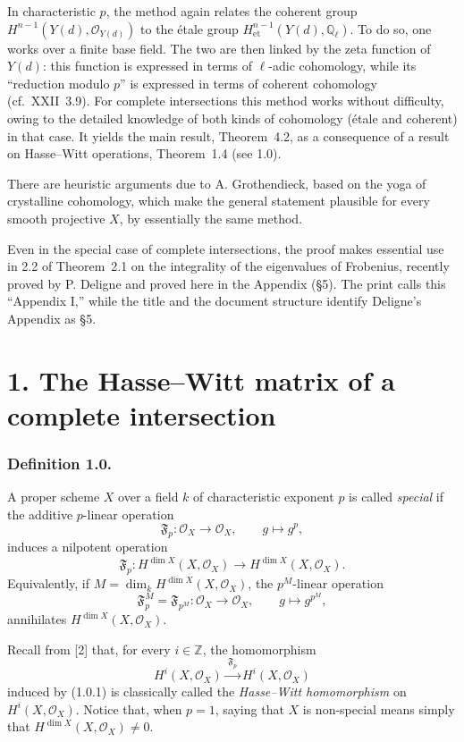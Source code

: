 In characteristic $p$, the method again relates the coherent group
$H^{n-1}(Y(d),\mathcal O_{Y(d)})$ to the étale group
$H^{n-1}_{\mathrm{et}}(Y(d),\mathbb Q_\ell)$.  To do so, one works over a
finite base field.  The two are then linked by the zeta function of $Y(d)$:
this function is expressed in terms of $\ell$-adic cohomology, while its
``reduction modulo $p$'' is expressed in terms of coherent cohomology
(cf.~XXII~3.9).  For complete intersections this method works without
difficulty, owing to the detailed knowledge of both kinds of cohomology
(étale and coherent) in that case.  It yields the main result, Theorem~4.2,
as a consequence of a result on Hasse--Witt operations, Theorem~1.4 (see
1.0).

There are heuristic arguments due to A. Grothendieck, based on the yoga of
crystalline cohomology, which make the general statement plausible for every
smooth projective $X$, by essentially the same method.

Even in the special case of complete intersections, the proof makes
essential use in 2.2 of Theorem~2.1 on the integrality of the eigenvalues of
Frobenius, recently proved by P. Deligne and proved here in the Appendix
(\S 5).  The print calls this ``Appendix I,'' while the title and the document
structure identify Deligne's Appendix as \S 5.

\section*{1. The Hasse--Witt matrix of a complete intersection}

\subsubsection*{Definition 1.0.}
A proper scheme $X$ over a field $k$ of characteristic exponent $p$ is called
\emph{special} if the additive $p$-linear operation
\begin{equation}\tag{1.0.1}
\mathfrak F_p:\mathcal O_X\longrightarrow\mathcal O_X,
\qquad g\longmapsto g^p,
\end{equation}
induces a nilpotent operation
\begin{equation}\tag{1.0.2}
\mathfrak F_p:H^{\dim X}(X,\mathcal O_X)
\longrightarrow H^{\dim X}(X,\mathcal O_X).
\end{equation}
Equivalently, if
$M=\dim_k H^{\dim X}(X,\mathcal O_X)$, the $p^M$-linear operation
\begin{equation}\tag{1.0.3}
\mathfrak F_p^M=\mathfrak F_{p^M}:\mathcal O_X\longrightarrow\mathcal O_X,
\qquad g\longmapsto g^{p^M},
\end{equation}
annihilates $H^{\dim X}(X,\mathcal O_X)$.

Recall from \textup{[2]} that, for every $i\in\mathbb Z$, the homomorphism
\begin{equation*}
H^i(X,\mathcal O_X)\xrightarrow{\ \mathfrak F_p\ }H^i(X,\mathcal O_X)
\end{equation*}
induced by (1.0.1) is classically called the \emph{Hasse--Witt
homomorphism} on $H^i(X,\mathcal O_X)$.  Notice that, when $p=1$, saying
that $X$ is non-special means simply that
$H^{\dim X}(X,\mathcal O_X)\ne0$.
